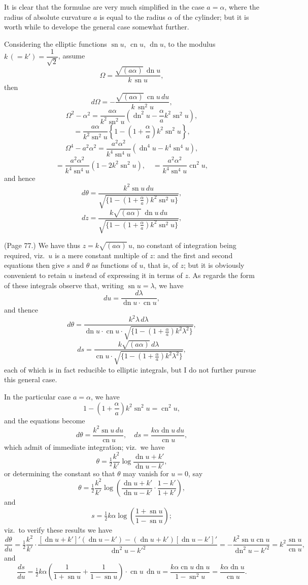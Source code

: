\documentclass[11pt,a4paper]{article}
\providecommand{\sn}{\operatorname{sn}}
\providecommand{\cn}{\operatorname{cn}}
\providecommand{\dn}{\operatorname{dn}}
\begin{document}
It is clear that the formulae are very much simplified in the case $a = \alpha$, where the radius of absolute curvature $a$ is equal to the radius $\alpha$ of the cylinder; but it is worth while to develope the general case somewhat further.

Considering the elliptic functions $\sn u$, $\cn u$, $\dn u$, to the modulus $k\, (= k') = \dfrac{1}{\sqrt{2}}$, assume
\[
\Omega = \frac{\sqrt{(a\alpha)}\,\dn u}{k\,\sn u},
\]
then
\[
d\Omega = -\frac{\sqrt{(a\alpha)}\,\cn u\, du}{k\,\sn^2 u},
\]
\[
\Omega^2 - \alpha^2 = \frac{a\alpha}{k^2 \sn^2 u}\left(\dn^2 u - \frac{\alpha}{a} k^2 \sn^2 u\right),
\]
\[
= \frac{a\alpha}{k^2 \sn^2 u}\left\{1 - \left(1 + \frac{\alpha}{a}\right) k^2 \sn^2 u\right\},
\]
\[
\Omega^4 - a^2 \alpha^2 = \frac{a^2 \alpha^2}{k^4 \sn^4 u}(\dn^4 u - k^4 \sn^4 u),
\]
\[
= \frac{a^2 \alpha^2}{k^4 \sn^4 u}(1 - 2k^2 \sn^2 u),\quad = \frac{a^2 \alpha^2}{k^4 \sn^4 u} \cn^2 u,
\]
and hence
\[
d\theta = \frac{k^2 \sn u\, du}{\sqrt{\{1 - (1 + \tfrac{\alpha}{a}) k^2 \sn^2 u\}}},
\]
\[
dz = \frac{k \sqrt{(a\alpha)}\,\dn u\, du}{\sqrt{\{1 - (1 + \tfrac{\alpha}{a}) k^2 \sn^2 u\}}},
\]

\bigskip

\noindent (Page 77.) We have thus $z = k\sqrt{(a\alpha)}\, u$, no constant of integration being required, viz.\ $u$ is a mere constant multiple of $z$: and the first and second equations then give $s$ and $\theta$ as functions of $u$, that is, of $z$; but it is obviously convenient to retain $u$ instead of expressing it in terms of $z$. As regards the form of these integrals observe that, writing $\sn u = \lambda$, we have
\[
du = \frac{d\lambda}{\dn u \cdot \cn u},
\]
and thence
\[
d\theta = \frac{k^2 \lambda\, d\lambda}{\dn u \cdot \cn u \cdot \sqrt{\{1 - (1 + \tfrac{\alpha}{a}) k^2 \lambda^2\}}},
\]
\[
ds = \frac{k \sqrt{(a\alpha)}\, d\lambda}{\cn u \cdot \sqrt{\{1 - (1 + \tfrac{\alpha}{a}) k^2 \lambda^2\}}},
\]
each of which is in fact reducible to elliptic integrals, but I do not further pursue this general case.

In the particular case $a = \alpha$, we have
\[
1 - \left(1 + \frac{\alpha}{a}\right) k^2 \sn^2 u = \cn^2 u,
\]
and the equations become
\[
d\theta = \frac{k^2 \sn u\, du}{\cn u},\quad ds = \frac{k\alpha \dn u\, du}{\cn u},
\]
which admit of immediate integration; viz.\ we have
\[
\theta = \tfrac{1}{2}\frac{k^2}{k'}\log\frac{\dn u + k'}{\dn u - k'},
\]
or determining the constant so that $\theta$ may vanish for $u = 0$, say
\[
\theta = \tfrac{1}{2}\frac{k^2}{k'}\log\left(\frac{\dn u + k'}{\dn u - k'} \cdot \frac{1 - k'}{1 + k'}\right),
\]
and
\[
s = \tfrac{1}{2}k\alpha \log\left(\frac{1 + \sn u}{1 - \sn u}\right);
\]
viz.\ to verify these results we have
\[
\frac{d\theta}{du} = \tfrac{1}{2}\frac{k^2}{k'} \cdot \frac{[\dn u + k']'(\dn u - k') - (\dn u + k')[\dn u - k']'}{\dn^2 u - k'^2} = -\frac{k^2 \sn u \cn u}{\dn^2 u - k'^2} = k^2 \frac{\sn u}{\cn u},
\]
and
\[
\frac{ds}{du} = \tfrac{1}{2}k\alpha\left(\frac{1}{1 + \sn u} + \frac{1}{1 - \sn u}\right) \cdot \cn u\,\dn u = \frac{k\alpha \cn u \dn u}{1 - \sn^2 u} = \frac{k\alpha \dn u}{\cn u}.
\]
\end{document}
